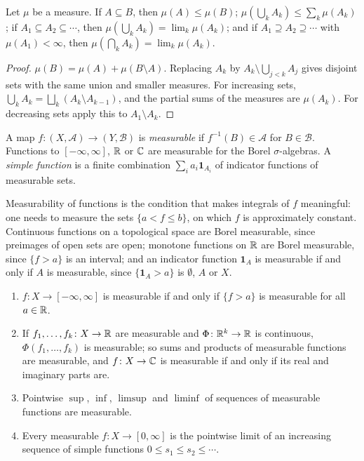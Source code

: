 \begin{proposition}\label{measure-theory:proposition-measure-properties}
Let $\mu$ be a measure. If $A \subseteq B$, then $\mu(A) \leq \mu(B)$; $\mu(\bigcup_kA_k) \leq \sum_k\mu(A_k)$; if $A_1 \subseteq A_2 \subseteq \cdots$, then $\mu(\bigcup_kA_k) = \lim_k\mu(A_k)$; and if
$A_1 \supseteq A_2 \supseteq \cdots$ with $\mu(A_1) < \infty$, then $\mu(\bigcap_kA_k) = \lim_k\mu(A_k)$.
\end{proposition}

\begin{proof}
$\mu(B) = \mu(A) + \mu(B \setminus A)$. Replacing $A_k$ by $A_k \setminus \bigcup_{j<k}A_j$ gives disjoint sets with the same union and smaller measures. For increasing sets,
$\bigcup_kA_k = \bigsqcup_k(A_k \setminus A_{k-1})$, and the partial sums of the measures are $\mu(A_k)$. For decreasing sets apply this to $A_1 \setminus A_k$.
\end{proof}

\begin{definition}\label{measure-theory:definition-measurable-function}
A map $f \colon (X, \mathcal{A}) \to (Y, \mathcal{B})$ is \emph{measurable} if $f^{-1}(B) \in \mathcal{A}$ for $B \in \mathcal{B}$. Functions to $[-\infty, \infty]$, $\mathbb{R}$ or $\mathbb{C}$ are measurable for the Borel
$\sigma$-algebras. A \emph{simple function} is a finite combination $\sum_ia_i\mathbf{1}_{A_i}$ of indicator functions of measurable sets.
\end{definition}

Measurability of functions is the condition that makes integrals of $f$ meaningful: one needs to measure the sets $\{a < f \leq b\}$, on which $f$ is approximately constant. Continuous functions on a
topological space are Borel measurable, since preimages of open sets are open; monotone functions on $\mathbb{R}$ are Borel measurable, since $\{f > a\}$ is an interval; and an indicator function $\mathbf{1}_A$ is
measurable if and only if $A$ is measurable, since $\{\mathbf{1}_A > a\}$ is $\emptyset$, $A$ or $X$.

\begin{proposition}\label{measure-theory:proposition-measurable-functions}
\begin{enumerate}
\item $f \colon X \to [-\infty, \infty]$ is measurable if and only if $\{f > a\}$ is measurable for all $a \in \mathbb{R}$.
\item If $f_1, \ldots, f_k \colon X \to \mathbb{R}$ are measurable and $\Phi \colon \mathbb{R}^k \to \mathbb{R}$ is continuous, $\Phi(f_1, \ldots, f_k)$ is measurable; so sums and products of measurable functions are
measurable, and $f \colon X \to \mathbb{C}$ is measurable if and only if its real and imaginary parts are.
\item Pointwise $\sup$, $\inf$, $\limsup$ and $\liminf$ of sequences of measurable functions are measurable.
\item Every measurable $f \colon X \to [0, \infty]$ is the pointwise limit of an increasing sequence of simple functions $0 \leq s_1 \leq s_2 \leq \cdots$.
\end{enumerate}
\end{proposition}

